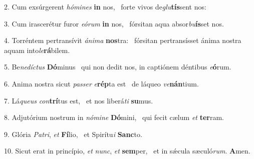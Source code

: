 2. Cum exsúrgerent \textit{hó}\textit{mi}\textit{nes} \textbf{in} nos, \ast\  forte vivos de\textit{glu}\textbf{tís}sent nos:\

3. Cum irascerétur furor \textit{e}\textit{ó}\textit{rum} \textbf{in} nos, \ast\  fórsitan aqua absor\textit{bu}\textbf{ís}set nos.\

4. Torréntem pertransívit \textit{á}\textit{ni}\textit{ma} \textbf{nos}tra: \ast\  fórsitan pertransísset ánima nostra aquam into\textit{le}\textbf{rá}bilem.\

5. Be\textit{ne}\textit{díc}\textit{tus} \textbf{Dó}minus \ast\  qui non dedit nos, in captiónem déntibus \textit{e}\textbf{ó}rum.\

6. Anima nostra sicut \textit{pas}\textit{ser} \textit{e}\textbf{rép}ta est \ast\  de láqueo \textit{ve}\textbf{nán}tium.\

7. Lá\textit{que}\textit{us} \textit{con}\textbf{trí}tus est, \ast\  et nos liberá\textit{ti} \textbf{su}mus.\

8. Adjutórium nostrum in \textit{nó}\textit{mi}\textit{ne} \textbf{Dó}mini, \ast\  qui fecit cælum \textit{et} \textbf{ter}ram.\

9. Glória \textit{Pa}\textit{tri}, \textit{et} \textbf{Fí}lio, \ast\  et Spirítu\textit{i} \textbf{Sanc}to.\

10. Sicut erat in princípio, \textit{et} \textit{nunc}, \textit{et} \textbf{sem}per, \ast\  et in sǽcula sæculó\textit{rum}. \textbf{A}men.\

